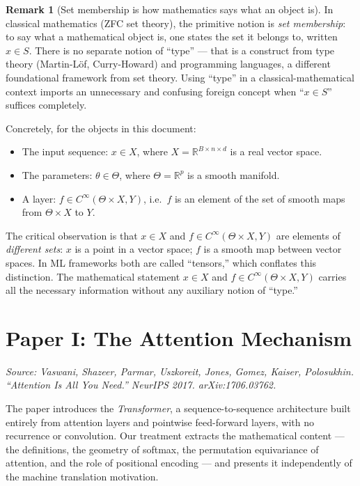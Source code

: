 \documentclass[11pt]{amsart}
\theoremstyle{plain}
\theoremstyle{definition}
\newtheorem{remark}[theorem]{Remark}
\begin{document}
\begin{remark}[Set membership is how mathematics says what an object is]
\label{rem:set-membership}
In classical mathematics (ZFC set theory), the primitive notion is
\emph{set membership}: to say what a mathematical object is, one states
the set it belongs to, written $x \in S$.  There is no separate notion of
``type'' — that is a construct from type theory (Martin-Löf, Curry-Howard)
and programming languages, a different foundational framework from set
theory.  Using ``type'' in a classical-mathematical context imports an
unnecessary and confusing foreign concept when ``$x \in S$'' suffices
completely.

Concretely, for the objects in this document:
\begin{itemize}
    \item The input sequence: $x \in X$, where $X = \mathbb{R}^{B \times n \times d}$
    is a real vector space.
    \item The parameters: $\theta \in \Theta$, where $\Theta = \mathbb{R}^p$ is a
    smooth manifold.
    \item A layer: $f \in C^\infty(\Theta \times X, Y)$, i.e.\ $f$ is an element
    of the set of smooth maps from $\Theta \times X$ to $Y$.
\end{itemize}
The critical observation is that $x \in X$ and $f \in C^\infty(\Theta \times X, Y)$
are elements of \emph{different sets}: $x$ is a point in a vector space; $f$ is
a smooth map between vector spaces.  In ML frameworks both are called
``tensors,'' which conflates this distinction.  The mathematical statement
$x \in X$ and $f \in C^\infty(\Theta \times X, Y)$ carries all the necessary
information without any auxiliary notion of ``type.''
\end{remark}

\part{Paper I: The Attention Mechanism}
\label{part:attention}

\emph{Source: Vaswani, Shazeer, Parmar, Uszkoreit, Jones, Gomez, Kaiser,
Polosukhin. ``Attention Is All You Need.'' NeurIPS 2017. arXiv:1706.03762.}

\bigskip

The paper introduces the \emph{Transformer}, a sequence-to-sequence architecture
built entirely from attention layers and pointwise feed-forward layers, with no
recurrence or convolution.  Our treatment extracts the mathematical content —
the definitions, the geometry of softmax, the permutation equivariance of
attention, and the role of positional encoding — and presents it independently
of the machine translation motivation.
\end{document}
